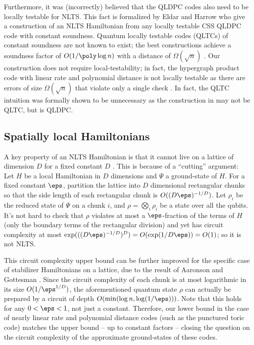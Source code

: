 \documentclass{toc}
\begin{document}
%
Furthermore, it was (incorrectly) believed that the QLDPC codes also need to be
locally testable  %
\cite{doi:10.1137/140975498} for NLTS. This fact is formalized by Eldar and Harrow \cite{8104078} who give a construction of an NLTS Hamiltonian from any
locally testable %
CSS QLDPC code with constant soundness. Quantum locally testable codes (QLTCs) of constant soundness are not known to exist; the best constructions achieve a soundness factor of $O(1/\poly \log n)$  with a distance of $\Omega(\sqrt{n})$ \cite{hastings17,1911.03069}. Our construction does not require local-testability; in fact, the hypergraph product code \cite{5205648} with linear rate and polynomial distance is not 
locally testable %
as there are errors of size $\Omega(\sqrt{n})$ that violate only a single check \cite[page 4]{1911.03069}. In fact, the QLTC intuition was formally shown to be unnecessary as the construction in \cite{nlts-proof} may not be QLTC, but is QLDPC.

\subsection{Spatially local Hamiltonians}
A key property of an NLTS Hamiltonian is that it cannot live on a lattice of dimension $D$ for a fixed constant $D$ \cite{10.1145/2491533.2491549}. This is because of a ``cutting'' argument: Let $H$ be a local Hamiltonian in $D$ dimensions and $\Psi$ a ground-state of $H$.
For a fixed constant $\eps$, partition the lattice into $D$ dimensional rectangular chunks so that the side length of each rectangular chunk is $O((D\eps)^{-1/D})$. Let $\rho_i$ be the reduced state of $\Psi$ on a chunk $i$, and $\rho = \bigotimes_i \rho_i$ be a state over all the qubits. It's not hard to check that $\rho$ violates at most a $\eps$-fraction of the terms of $H$ (only the boundary terms of the rectangular division) and yet has circuit complexity at most $\exp(((D \eps)^{-1/D} )^{D}) = O(\exp(1/D\eps)) = O(1)$; so it is not NLTS. 

This circuit complexity upper bound can be further improved for the specific case of stabilizer Hamiltonians on a lattice, due to the result of Aaronson and Gottesman \cite{PhysRevA.70.052328}. Since the circuit complexity of each chunk is at most logarithmic in its size $O(1/\eps^{1/D})$, the aforementioned quantum state $\rho$ can actually be prepared by a circuit of depth $O(\min (\log n, \log(1/\eps)))$. Note that this holds for any $0<\eps < 1$, not just a constant. Therefore, our lower bound in the case of nearly linear rate and polynomial distance codes (such as the punctured toric code) matches the upper bound -- up to constant factors -- closing the question on the circuit complexity of the approximate ground-states of these codes.
\end{document}
